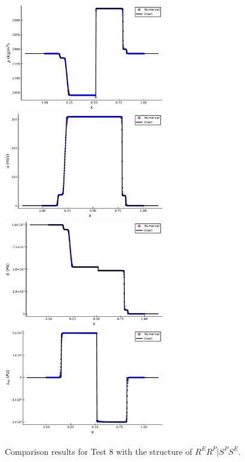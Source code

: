 \documentclass{article}
\numberwithin{equation}{section}
\numberwithin{table}{section}
\begin{document}
\begin{figure}[ht]
  \centering

  \includegraphics[width= 7cm] {case9rho.pdf}
  \includegraphics[width= 7cm] {case9u.pdf}
  \includegraphics[width= 7cm] {case9p.pdf}
  \includegraphics[width= 7cm] {case9sxx.pdf}

    \caption{Comparison results for Test 8 with the structure of $R^ER^P|S^PS^E$.  }
  \label{fig:case9}
\end{figure}
\end{document}
